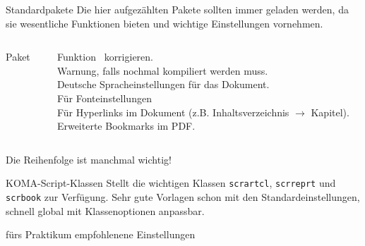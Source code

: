 \begin{frame}[fragile]{Standardpakete}
  Die hier aufgezählten Pakete sollten immer geladen werden, da sie wesentliche Funktionen bieten und wichtige Einstellungen vornehmen.
  \begin{columns}[T]
    \begin{column}{0.47\textwidth}
      \begin{block}{Paket}
        \begin{lstverbatim}
        \usepackage{fixltx2e}
        \usepackage[aux]{rerunfilecheck}

        \usepackage[main=ngerman]{babel}

        \usepackage{fontspec}

        \usepackage[unicode,pdfusetitle]{hyperref}
        \usepackage{bookmark}
        \end{lstverbatim}
      \end{block}
    \end{column}
    \begin{column}{0.47\textwidth}
      \begin{block}{Funktion}
        \LaTeXe\ korrigieren. \\
        Warnung, falls nochmal kompiliert werden muss. \\
        Deutsche Spracheinstellungen für das Dokument. \\
        Für Fonteinstellungen \\[2\baselineskip]
        Für Hyperlinks im Dokument (z.B. Inhaltsverzeichnis $\rightarrow$ Kapitel). \\
        Erweiterte Bookmarks im PDF.
      \end{block}
    \end{column}
  \end{columns}

  \vspace{5pt}
  Die Reihenfolge ist manchmal wichtig!
\end{frame}

\begin{frame}[fragile]{
  KOMA-Script-Klassen
  \hfill{}
}
  Stellt die wichtigen Klassen \texttt{scrartcl}, \texttt{scrreprt} und \texttt{scrbook} zur Verfügung.
  Sehr gute Vorlagen schon mit den Standardeinstellungen, schnell global mit Klassenoptionen anpassbar.
  \begin{block}{fürs Praktikum empfohlenene Einstellungen}
  \end{block}
\end{frame}

